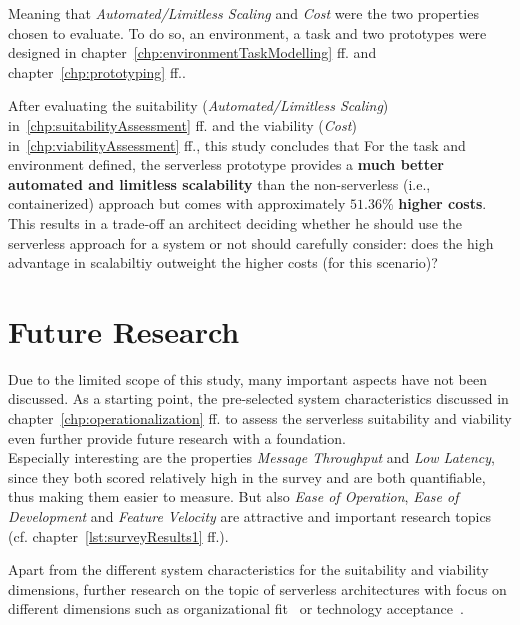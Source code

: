 Meaning that \textit{Automated/Limitless Scaling} and \textit{Cost} were the two properties chosen to evaluate. To do so, an environment, a task and two prototypes were designed in chapter~\vref{chp:environmentTaskModelling} ff. and chapter~\vref{chp:prototyping} ff.. 

After evaluating the suitability (\textit{Automated/Limitless Scaling}) in~\vref{chp:suitabilityAssessment} ff. and the viability (\textit{Cost}) in~\vref{chp:viabilityAssessment} ff., this study concludes that 
For the task and environment defined, the serverless prototype provides a \textbf{much better automated and limitless scalability} than the non-serverless (i.e., containerized) approach but comes with approximately $51.36\%$ \textbf{higher costs}.\\
This results in a trade-off an architect deciding whether he should use the serverless approach for a system or not should carefully consider: does the high advantage in scalabiltiy outweight the higher costs (for this scenario)? 


\section{Future Research}

Due to the limited scope of this study, many important aspects have not been discussed. As a starting point, the pre-selected system characteristics discussed in chapter~\vref{chp:operationalization} ff. to assess the serverless suitability and viability even further provide future research with a foundation. \\
Especially interesting are the properties \textit{Message Throughput} and \textit{Low Latency}, since they both scored relatively high in the survey and are both quantifiable, thus making them easier to measure. But also \textit{Ease of Operation}, \textit{Ease of Development} and \textit{Feature Velocity} are attractive and important research topics (cf. chapter~\vref{lst:surveyResults1} ff.). 

Apart from the different system characteristics for the suitability and viability dimensions, further research on the topic of serverless architectures with focus on different dimensions such as organizational fit~\autocite[see ][]{Depietro1990TheEnvironment}\highcomma\autocite[see ][]{Rogers1995DiffusionInnovations} or technology acceptance~\autocite[see ][]{Venkatesh2003UserViewb}\highcomma\autocite[see ][]{Davis1986AResults}\highcomma\autocite[see ][]{Davis1989UserModelsb}\highcomma\autocite[see ][]{Davis1989PerceivedTechnology}.

